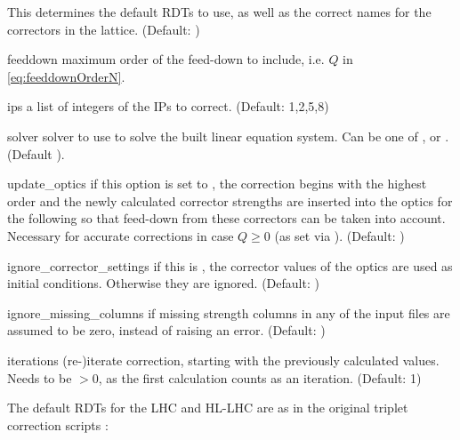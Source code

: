 \begin{options}
                     This determines the default RDTs to use, as well as the correct names for the correctors
                     in the lattice. (Default: )
        \item[feeddown] maximum order of the feed-down to include, i.e. $Q$ in \cref{eq:feeddownOrderN}. 
        \item[ips] a list of integers of the IPs to correct. (Default: 1,2,5,8)
        \item[solver] solver to use to solve the built linear equation system. 
                      Can be one of ,  or .  (Default ).
        \item[update\_optics] if this option is set to , the correction begins with the highest 
                              order and the newly calculated corrector strengths are inserted into the optics 
                              for the following so that feed-down from these correctors can be taken into account.
                              Necessary for accurate corrections in case $Q \geq 0$ (as set via ).
                              (Default: )
        \item[ignore\_corrector\_settings] if this is , the corrector values of the
                                          optics are used as initial conditions. Otherwise they are ignored.
                                          (Default: )
        \item[ignore\_missing\_columns] if  missing strength columns in any of the input files are assumed
                                        to be zero, instead of raising an error.
                                        (Default: )
        \item[iterations] (re-)iterate correction, starting with the previously
                          calculated values. Needs to be $> 0$, as the first calculation
                          counts as an iteration.
                          (Default: 1)
\end{options}
%
The default RDTs for the LHC and HL-LHC are as in the original triplet correction scripts \cite{FartoukhLHCNonlinearTriplet2008,FartoukhHLLHCNonlinearTriplet2012}:
%
